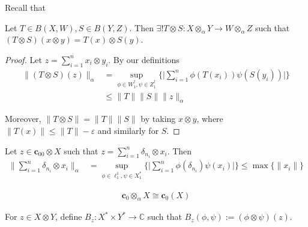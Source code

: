 

Recall that

\begin{proposition}
  Let $T \in B(X, W), S \in B(Y, Z)$. Then $\exists! T \otimes
  S : X \otimes_\alpha Y \to W \otimes_\alpha Z$ such that $(T
  \otimes S)(x \otimes y) = T(x) \otimes S(y)$.
\end{proposition}
\begin{proof}
  Let $z = \sum_{i = 1}^{n} x_i \otimes y_i$. By our definitions
  \begin{align*}
    \|(T \otimes S)(z)\|_\alpha & = \sup_{\phi \in W^\dagger_1, \psi \in
    Z^\dagger_1} \Bigg\{ \bigg|\sum_{i = 1}^{n} \phi(T(x_i))
    \psi(S(y_i))\bigg|\Bigg\} \\
    & \le \|T\|\|S\| \|z\|_\alpha
  \end{align*}

  Moreover, $\|T \otimes S\| = \|T\|\|S\|$ by taking $x \otimes y$,
  where $\|T(x)\| \le \|T\| - \varepsilon$ and similarly for $S$.
\end{proof}

\begin{exercise}
  Let $z \in \textbf{c}_{00} \otimes X$ such that $z = \sum_{i =
  1}^{n} \delta_{n_i} \otimes x_i$. Then
  \begin{align*}
    \Big \| \sum_{i = 1}^{n} \delta_{n_i} \otimes x_i \Big \|_\alpha
    &= \sup_{\phi \in \ell^{1}_1, \psi \in X^*_1} \Big \{
    \Big|\sum_{i = 1}^{n} \phi(\delta_{n_i})  \psi(x_i) \Big|\Big \}
    \le \max \{\|x_i\|\}
  \end{align*}
\end{exercise}

\begin{theorem}
  \begin{align*}
    \textbf{c}_0 \otimes_\alpha X \cong \textbf{c}_0(X)
  \end{align*}
\end{theorem}

For $z \in X \otimes Y$, define $B_z: X^* \times Y^* \to \mathbb{C}$
such that $B_z(\phi, \psi):= (\phi \otimes \psi)(z)$.
